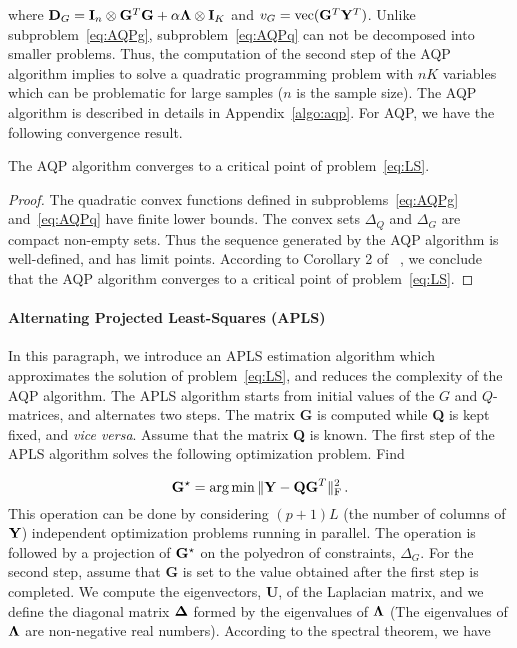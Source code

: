 \noindent where ${\bf D}_G = {\bf I}_{n} \otimes {\bf G}^T {\bf G } + \alpha {\bf \Lambda}  \otimes {\bf I}_K$ and $v_G = {\rm vec}({\bf G}^T{\bf  Y}^T)$. Unlike subproblem~\eqref{eq:AQPg}, subproblem~\eqref{eq:AQPq} can not be decomposed into smaller problems. Thus, the computation of the second step of the AQP algorithm implies to solve a quadratic programming problem with $nK$ variables which can be problematic for large samples ($n$ is the sample size). 
The AQP algorithm is described in details in Appendix~\ref{algo:aqp}. For AQP, we have the following convergence result.
\begin{thm}
\label{th}
	The AQP algorithm converges to a critical point of problem~\eqref{eq:LS}.
\end{thm}
\begin{proof}
  The quadratic convex functions defined in subproblems~\eqref{eq:AQPg}
  and~\eqref{eq:AQPq} have finite lower bounds. The convex sets $\Delta_Q$ and
  $\Delta_G$ are compact non-empty sets. Thus the sequence generated by the AQP
  algorithm is well-defined, and has limit points. According to Corollary 2 of
  ~\cite{Grippo2000}, we conclude that the AQP algorithm converges to a critical
  point of problem~\eqref{eq:LS}.
\end{proof}

\paragraph{Alternating Projected Least-Squares (APLS)} In this paragraph, we
introduce an APLS estimation algorithm which approximates the solution of
problem~\eqref{eq:LS}, and reduces the complexity of the AQP algorithm. The APLS
algorithm starts from initial values of the $G$ and $Q$-matrices, and alternates
two steps. The matrix {\bf G} is computed while {\bf Q} is kept fixed, and {\it
  vice versa}. Assume that the matrix {\bf Q} is known. The first step of the
APLS algorithm solves the following optimization problem. Find

\begin{equation}
{\bf G}^\star = \arg \min  \|  {\bf Y} - {\bf QG}^T \|^2_{\rm F} \, .
\end{equation}
This operation can be done by considering $(p+1)L$ (the number of columns of
${\bf Y}$) independent optimization problems running in parallel. The operation
is followed by a projection of ${\bf G}^\star$ on the polyedron of constraints,
$\Delta_G$. For the second step, assume that {\bf G} is set to the value
obtained after the first step is completed. We compute the eigenvectors, {\bf
  U}, of the Laplacian matrix, and we define the diagonal matrix ${\bf \Delta}$
formed by the eigenvalues of ${\bf \Lambda}$ (The eigenvalues of ${\bf \Lambda}$
are non-negative real numbers). According to the spectral theorem, we have

